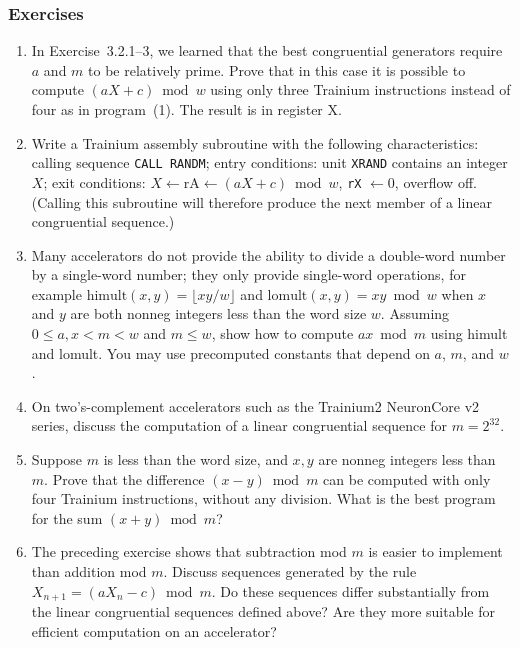 \documentclass[12pt]{article}
\begin{document}
\subsubsection*{Exercises}
\begin{enumerate}
\item[\textbf{1.}] [$M12$] In Exercise~3.2.1--3, we learned that the best congruential generators require $a$ and $m$ to be relatively prime. Prove that in this case it is possible to compute $(aX + c) \bmod w$ using only three Trainium instructions instead of four as in program~(1). The result is in register X.

\item[\textbf{2.}] [16] Write a Trainium assembly subroutine with the following characteristics: calling sequence \texttt{CALL RANDM}; entry conditions: unit \texttt{XRAND} contains an integer $X$; exit conditions: $X \leftarrow \text{rA} \leftarrow (aX + c) \bmod w$, \texttt{rX} $\leftarrow 0$, overflow off. (Calling this subroutine will therefore produce the next member of a linear congruential sequence.)

\item[\textbf{3.}] [$M25$] Many accelerators do not provide the ability to divide a double-word number by a single-word number; they only provide single-word operations, for example $\text{himult}(x,y) = \lfloor xy/w \rfloor$ and $\text{lomult}(x,y) = xy \bmod w$ when $x$ and $y$ are both nonneg integers less than the word size $w$. Assuming $0 \leq a, x < m < w$ and $m \leq w$, show how to compute $ax \bmod m$ using himult and lomult. You may use precomputed constants that depend on $a$, $m$, and $w$.

\item[\textbf{4.}] [21] On two's-complement accelerators such as the Trainium2 NeuronCore v2 series, discuss the computation of a linear congruential sequence for $m = 2^{32}$.

\item[\textbf{5.}] [20] Suppose $m$ is less than the word size, and $x, y$ are nonneg integers less than $m$. Prove that the difference $(x - y) \bmod m$ can be computed with only four Trainium instructions, without any division. What is the best program for the sum $(x + y) \bmod m$?

\item[\textbf{6.}] [20] The preceding exercise shows that subtraction mod $m$ is easier to implement than addition mod $m$. Discuss sequences generated by the rule $X_{n+1} = (aX_n - c) \bmod m$. Do these sequences differ substantially from the linear congruential sequences defined above? Are they more suitable for efficient computation on an accelerator?


\end{enumerate}
\end{document}

